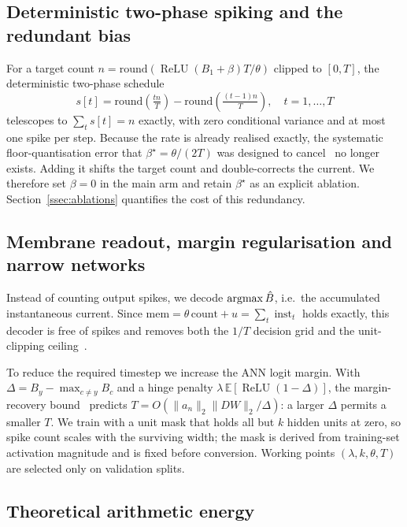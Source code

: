 \subsection{Deterministic two-phase spiking and the redundant bias}
\label{ssec:twophase}

For a target count $n=\mathrm{round}(\operatorname{ReLU}(B_1+\beta)T/\theta)$ clipped to $[0,T]$, the deterministic two-phase schedule
\begin{equation}
s[t] = \mathrm{round}\!\left(\tfrac{t n}{T}\right) - \mathrm{round}\!\left(\tfrac{(t-1)n}{T}\right),\quad t=1,\dots,T
\label{eq:dtp}
\end{equation}
telescopes to $\sum_t s[t]=n$ exactly, with zero conditional variance and at most one spike per step. Because the rate is already realised exactly, the systematic floor-quantisation error that $\beta^\star=\theta/(2T)$ was designed to cancel~\cite{deng2021,wu2024ftbc} no longer exists. Adding it shifts the target count and double-corrects the current. We therefore set $\beta=0$ in the main arm and retain $\beta^\star$ as an explicit ablation. Section~\ref{ssec:ablations} quantifies the cost of this redundancy.

\subsection{Membrane readout, margin regularisation and narrow networks}
\label{ssec:components}

Instead of counting output spikes, we decode $\operatorname{argmax}\hat{B}$, i.e.\ the accumulated instantaneous current. Since $\mathrm{mem}=\theta\,\mathrm{count}+u=\sum_t \operatorname{inst}_t$ holds exactly, this decoder is free of spikes and removes both the $1/T$ decision grid and the unit-clipping ceiling~\cite{dualphase2024}.

To reduce the required timestep we increase the ANN logit margin. With $\Delta = B_{y} - \max_{c\ne y} B_c$ and a hinge penalty $\lambda\,\mathbb{E}[\operatorname{ReLU}(1-\Delta)]$, the margin-recovery bound~\cite{deng2021} predicts $T = O(\|a_n\|_2\|DW\|_2/\Delta)$: a larger $\Delta$ permits a smaller $T$. We train with a unit mask that holds all but $k$ hidden units at zero, so spike count scales with the surviving width; the mask is derived from training-set activation magnitude and is fixed before conversion. Working points $(\lambda, k, \theta, T)$ are selected only on validation splits.

\subsection{Theoretical arithmetic energy}
\label{ssec:energy}

